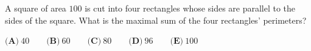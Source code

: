 A square of area $100$ is cut into four rectangles whose sides are parallel to the sides of the square. What is the maximal sum of the four rectangles' perimeters?

$\textbf{(A)}\ 40\qquad\textbf{(B)}\ 60\qquad\textbf{(C)}\ 80\qquad\textbf{(D)}\ 96\qquad\textbf{(E)}\ 100$
